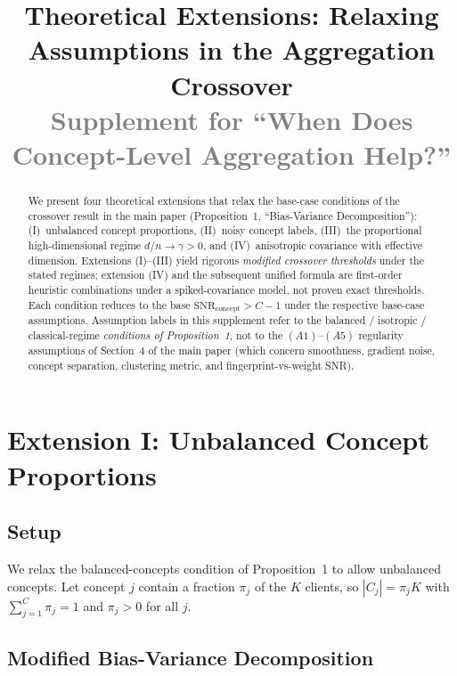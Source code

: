 \documentclass[11pt,a4paper]{article}
\title{\Large Theoretical Extensions: Relaxing Assumptions in the Aggregation Crossover\\[6pt]
\large \textcolor{gray}{Supplement for ``When Does Concept-Level Aggregation Help?''}}
\author{}
\date{}
\newcommand{\SNR}{\mathrm{SNR}}
\begin{document}
\maketitle

\begin{abstract}
We present four theoretical extensions that relax the base-case conditions of the crossover result in the main paper (Proposition~1, ``Bias-Variance Decomposition''): (I)~unbalanced concept proportions, (II)~noisy concept labels, (III)~the proportional high-dimensional regime $d/n \to \gamma > 0$, and (IV)~anisotropic covariance with effective dimension. Extensions (I)--(III) yield rigorous \emph{modified crossover thresholds} under the stated regimes; extension (IV) and the subsequent unified formula are first-order heuristic combinations under a spiked-covariance model, not proven exact thresholds. Each condition reduces to the base $\SNR_{\mathrm{concept}} > C - 1$ under the respective base-case assumptions. Assumption labels in this supplement refer to the balanced / isotropic / classical-regime \emph{conditions of Proposition~1}, not to the $(A1)$--$(A5)$ regularity assumptions of Section~4 of the main paper (which concern smoothness, gradient noise, concept separation, clustering metric, and fingerprint-vs-weight SNR).
\end{abstract}

\tableofcontents
\vspace{1em}


\section{Extension I: Unbalanced Concept Proportions}

\subsection{Setup}

We relax the balanced-concepts condition of Proposition~1 to allow unbalanced concepts. Let concept $j$ contain a fraction $\pi_j$ of the $K$ clients, so $|C_j| = \pi_j K$ with $\sum_{j=1}^C \pi_j = 1$ and $\pi_j > 0$ for all $j$.

\subsection{Modified Bias-Variance Decomposition}
\end{document}
